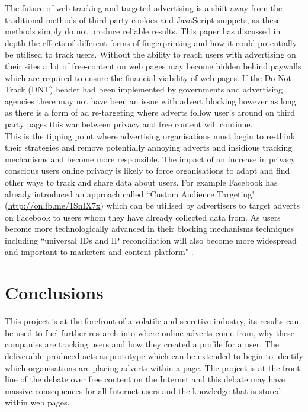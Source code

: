 \documentclass[12pt]{article}
\begin{document}
The future of web tracking and targeted advertising is a shift away from the traditional methods of third-party cookies and JavaScript snippets, as these methods simply do not produce reliable results. This paper has discussed in depth the effects of different forms of fingerprinting and how it could potentially be utilised to track users. Without the ability to reach users with advertising on their sites a lot of free-content on web pages may become hidden behind paywalls which are required to ensure the financial viability of web pages. If the Do Not Track (DNT) header had been implemented by governments  and advertising agencies there may not have been an issue with advert blocking however as long as there is a form of ad re-targeting where adverts follow user's around on third party pages this war between privacy and free content will continue.  \\

This is the tipping point where advertising organisations must begin to re-think their strategies and remove potentially annoying adverts and insidious tracking mechanisms and become more responsible. The impact of an increase in privacy conscious users online privacy is likely to force organisations to adapt and find other ways to track and share data about users. For example Facebook has already introduced an approach called ``Custom Audience  Targeting" (\url{http://on.fb.me/1SnIX7x}) which can be utilised by advertisers to target adverts on Facebook to users whom they have already collected data from. As users become more technologically advanced in their blocking mechanisms techniques including ``universal IDs and IP reconciliation will also become more widespread and important to marketers and content platform" \parencite{tippingPoint}.

\pagebreak

\section{Conclusions}
This project is at the forefront of a volatile and secretive industry, its results can be used to fuel further research into where online adverts come from, why these companies are tracking users and how they created a profile for a user. The deliverable produced acts as prototype which can be extended to begin to identify which organisations are placing adverts within a page. The project is at the front line of the debate over free content on the Internet and this debate may have massive consequences for all Internet users and the knowledge that is stored within web pages. \\
\end{document}
